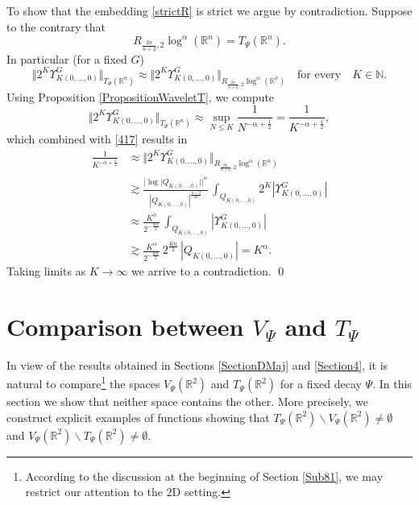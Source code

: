 \documentclass[11pt, a4paper,leqno]{amsart}
\theoremstyle{plain}
\numberwithin{equation}{section}
\theoremstyle{definition}
\theoremstyle{remark}
\begin{document}
To show that the embedding \eqref{strictR} is strict we argue by contradiction. Suppose to the contrary that
\[
R_{\frac{2n}{n+2},2}\log^{\alpha}(\mathbb{R}^{n})=T_{\Psi}(\mathbb{R}^{n}).
\]
In particular (for a fixed $G$)
\begin{equation}
\Vert2^{K}\Upsilon_{K (0,\ldots,0)}^{G}\Vert_{T_{\Psi}(\mathbb{R}^{n})}%
\approx\Vert2^{K}\Upsilon_{K (0,\ldots,0)}^{G}\Vert_{R_{\frac{2n}{n+2},2}%
\log^{\alpha}(\mathbb{R}^{n})}\quad\text{for every}\quad K\in\mathbb{N}.
\label{417}%
\end{equation}
Using Proposition \ref{PropositionWaveletT}, we compute
\[
\Vert2^{K}\Upsilon_{K (0,\ldots,0)}^{G}\Vert_{T_{\Psi}(\mathbb{R}^{n})}%
\approx\sup_{N\leq K}\frac{1}{N^{-\alpha+\frac{1}{2}}}=\frac{1}{K^{-\alpha
+\frac{1}{2}}},
\]
which combined with \eqref{417} results in
\begin{align*}
\frac{1}{K^{-\alpha+\frac{1}{2}}}  &  \approx\Vert2^{K}\Upsilon_{K (0,\ldots
,0)}^{G}\Vert_{R_{\frac{2n}{n+2},2}\log^{\alpha}(\mathbb{R}^{n})}\\
&  \gtrsim \frac{|\log|Q_{K(0,\ldots,0)}||^{\alpha}}{|Q_{K(0,\ldots,0)}%
|^{\frac{n-2}{2n}}}\,\int_{Q_{K(0,\ldots,0)}}2^{K}|\Upsilon_{K (0,\ldots
,0)}^{G}|\\
&  \approx\frac{K^{\alpha}}{2^{-\frac{Kn}{2}}}\,\int_{Q_{K(0,\ldots,0)}%
}|\Upsilon_{K (0,\ldots,0)}^{G}|\\
&  \gtrsim\frac{K^{\alpha}}{2^{-\frac{Kn}{2}}}\,2^{\frac{Kn}{2}}\,|Q_{K(0,\ldots
,0)}|=K^{\alpha}.
\end{align*}
Taking limits as $K\rightarrow\infty$ we arrive to a contradiction. \qed

\section{Comparison between $V_{\Psi}$ and $T_{\Psi}$}


In view of the results obtained in Sections \ref{SectionDMaj} and \ref{Section4}, it is natural to compare\footnote{According to the discussion at the beginning of Section \ref{Sub81}, we may restrict our attention to the $2$D setting.} the
spaces $V_{\Psi}(\mathbb{R}^{2})$ and $T_{\Psi}(\mathbb{R}^{2})$ for a fixed decay $\Psi$. In this
section we show that neither space contains the other. More precisely, we
construct explicit examples of functions showing that $T_{\Psi}(\mathbb{R}%
^{2})\backslash V_{\Psi}(\mathbb{R}^{2})\neq\emptyset$ and $V_{\Psi
}(\mathbb{R}^{2})\backslash T_{\Psi}(\mathbb{R}^{2})\neq\emptyset$.
\end{document}
